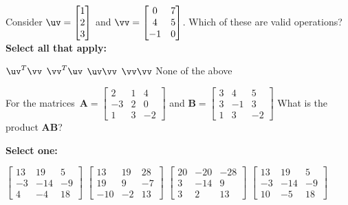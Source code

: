 \documentclass[11pt,addpoints,answers]{exam}
\numberwithin{equation}{section} %
\numberwithin{figure}{section} %
\numberwithin{table}{section} %
\begin{document}
\begin{questions}
    \question[2] Consider $\uv = \begin{bmatrix} 1 \\ 2 \\ 3\end{bmatrix}$ and $\vv = \begin{bmatrix} 0 & 7\\ 4 & 5\\ -1 & 0 \end{bmatrix}$. Which of these are valid operations? \\
    \textbf{Select all that apply:}
    
    \begin{checkboxes}
    {%
    \checkboxchar{$\Box$} \checkedchar{$\blacksquare$}
    
    \choice $\uv^T\vv$
    \choice $\vv^T\uv$
    \choice $\uv \vv$
    \choice $\vv \vv$
    \choice None of the above
    }
    
    \end{checkboxes}
    
    
\clearpage
    \question[2] For the matrices $\mathbf{A}=\begin{bmatrix} 2 & 1 & 4 \\ -3 & 2 & 0 \\ 1 & 3 & -2 \end{bmatrix} $ and $\mathbf{B}=\begin{bmatrix} 3 & 4 & 5 \\ 3 & -1 & 3 \\ 1 & 3 & -2 \end{bmatrix}$
What is the product $\mathbf{AB}$?

    \textbf{Select one:}
    \begin{checkboxes}
        \choice $ \begin{bmatrix} 13 & 19 & 5 \\ -3 & -14 & -9 \\ 4 & -4 & 18 \end{bmatrix} $
        \choice $ \begin{bmatrix} 13 & 19 & 28 \\ 19 & 9 & -7 \\ -10 & -2 & 13 \end{bmatrix} $
        \choice $ \begin{bmatrix} 20 & -20 & -28 \\ 3 & -14 & 9 \\ 3 & 2 & 13 \end{bmatrix} $
        \choice $ \begin{bmatrix} 13 & 19 & 5 \\ -3 & -14 & -9 \\ 10 & -5 & 18 \end{bmatrix} $
    \end{checkboxes}



\end{questions}
\end{document}

